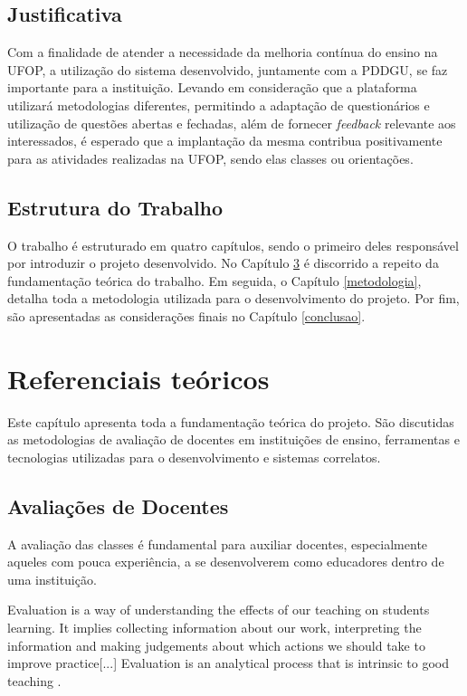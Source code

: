 \documentclass[
  12pt,       %
  openright,      %
  oneside,      %
  a4paper,      %
  english,      %
  french,        %
  spanish,     %
  brazil        %
  ]{abntex2-decsi}
\begin{document}
    \section{Justificativa}

        Com a finalidade de atender a necessidade da melhoria contínua do ensino na UFOP, a utilização do sistema desenvolvido, juntamente com a PDDGU, se faz importante para a instituição. Levando em consideração que a plataforma utilizará metodologias diferentes, permitindo a adaptação de questionários e utilização de questões abertas e fechadas, além de fornecer \textit{feedback} relevante aos interessados, é esperado que a implantação da mesma contribua positivamente para as atividades realizadas na UFOP, sendo elas classes ou orientações.

    \section{Estrutura do Trabalho}

        O trabalho é estruturado em quatro capítulos, sendo o primeiro deles responsável por introduzir o projeto desenvolvido. No Capítulo \ref{ref_teoricos} é discorrido a repeito da fundamentação teórica do trabalho. Em seguida, o Capítulo \ref{metodologia}, detalha toda a metodologia utilizada para o desenvolvimento do projeto. Por fim, são apresentadas as considerações finais no Capítulo \ref{conclusao}.

\chapter{Referenciais teóricos}\label{ref_teoricos}

	Este capítulo apresenta toda a fundamentação teórica do projeto. São discutidas as metodologias de avaliação de docentes em instituições de ensino, ferramentas e tecnologias utilizadas para o desenvolvimento e sistemas correlatos.

    \section{Avaliações de Docentes}

        A avaliação das classes é fundamental para auxiliar docentes, especialmente aqueles com pouca experiência, a se desenvolverem como educadores dentro de uma instituição.

        \begin{citacao}[english]
            Evaluation is a way of understanding the effects of our teaching on students learning. It implies collecting information about our work, interpreting the information and making judgements about which actions we should take to improve practice[...] Evaluation is an analytical process that is intrinsic to good teaching .
        \end{citacao}
\end{document}
